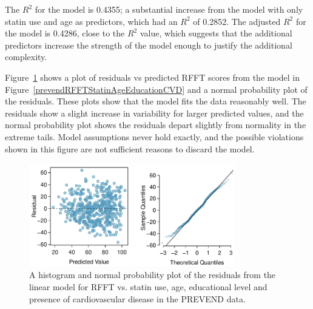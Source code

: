 The $R^2$ for the model is 0.4355; a substantial increase from the model with only statin use and age as predictors, which had an $R^2$ of 0.2852. The adjusted $R^2$ for the model is 0.4286, close to the $R^2$ value, which suggests that the additional predictors increase the strength of the model enough to justify the additional complexity.

\textD{\newpage}

Figure~\ref{prevendRFFTStatinAgeEducCVDResidNormPlot} shows a plot of residuals vs predicted RFFT scores from the model in Figure~\ref{prevendRFFTStatinAgeEducationCVD} and a normal probability plot of the residuals. These plots show that the model fits the data reasonably well. The residuals show a slight increase in variability for larger predicted values, and the normal probability plot shows the residuals depart slightly from normality in the extreme tails.  Model assumptions never hold exactly, and the possible violations shown in this figure are not sufficient reasons to discard the model.

\begin{figure}[h]
	\centering
	\includegraphics[width=0.8\textwidth]
	{ch_multiple_linear_regression_oi_biostat/figures/prevendRFFTStatinAgeEducCVDResidNormPlot/prevendRFFTStatinAgeEducCVDResidNormPlot.pdf}
	\caption{A histogram and normal probability plot of the residuals from the linear model for RFFT vs. statin use, age, educational level and presence of cardiovascular disease in the PREVEND data.}
	\label{prevendRFFTStatinAgeEducCVDResidNormPlot}
\end{figure}

